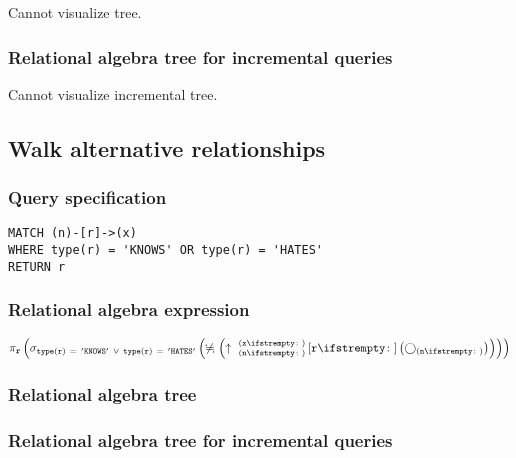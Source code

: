Cannot visualize tree.

\subsubsection*{Relational algebra tree for incremental queries}

Cannot visualize incremental tree.

\subsection{Walk alternative relationships}

\subsubsection*{Query specification}

\begin{lstlisting}
MATCH (n)-[r]->(x)
WHERE type(r) = 'KNOWS' OR type(r) = 'HATES'
RETURN r
\end{lstlisting}

\subsubsection*{Relational algebra expression}

$\projection{\var{r}} \left(\selection{\mathtt{type(r)~=~'KNOWS'~\lor~type(r)~=~'HATES'}} \left(\alldifferent{} \left(\expandout{n}{x}{}{r}{} \left(\getvertices{n}{}\right)\right)\right)\right)$

\subsubsection*{Relational algebra tree}


\subsubsection*{Relational algebra tree for incremental queries}

